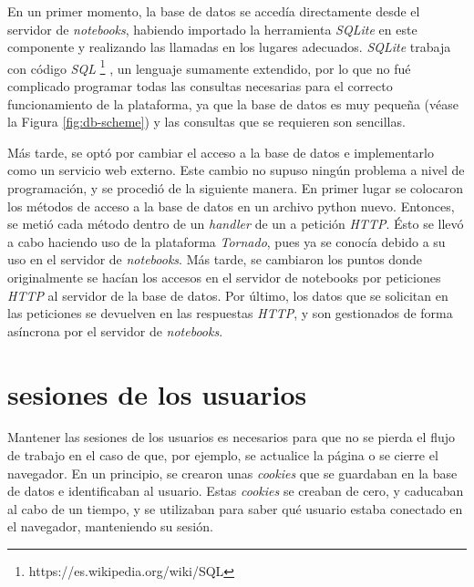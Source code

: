\documentclass[11pt,spanish,listoffigures,listoftables]{tfgetsinf}
\begin{document}
En un primer momento, la base de datos se accedía directamente desde el servidor de \textit{notebooks}, habiendo importado la herramienta \textit{SQLite} en este componente y realizando las llamadas en los lugares adecuados. \textit{SQLite} trabaja con código \textit{SQL} \footnote{https://es.wikipedia.org/wiki/SQL} , un lenguaje sumamente extendido,  por lo que no fué complicado programar todas las consultas necesarias para el correcto funcionamiento de la plataforma, ya que la base de datos es muy pequeña (véase la Figura \ref{fig:db-scheme}) y las consultas que se requieren son sencillas.

Más tarde, se optó por cambiar el acceso a la base de datos e implementarlo como un servicio web externo. Este cambio no supuso ningún problema a nivel de programación, y se procedió de la siguiente manera. En primer lugar se colocaron los métodos de acceso a la base de datos en un archivo python nuevo. Entonces, se metió cada método dentro de un \textit{handler} de un a petición \textit{HTTP}. Ésto se llevó a cabo haciendo uso de la plataforma \textit{Tornado}, pues ya se conocía debido a su uso en el servidor de \textit{notebooks}. Más tarde, se cambiaron los puntos donde originalmente se hacían los accesos en el servidor de notebooks por peticiones \textit{HTTP} al servidor de la base de datos. Por último, los datos que se solicitan en las peticiones se devuelven en las respuestas \textit{HTTP}, y son gestionados de forma asíncrona por el servidor de \textit{notebooks}.



\section{sesiones de los usuarios}
\label{sec:desarrollo-sesiones}

Mantener las sesiones de los usuarios es necesarios para que no se pierda el flujo de trabajo en el caso de que, por ejemplo, se actualice la página o se cierre el navegador. En un principio, se crearon unas \textit{cookies} que se guardaban en la base de datos e identificaban al usuario. Estas \textit{cookies} se creaban de cero, y caducaban al cabo de un tiempo, y se utilizaban para saber qué usuario estaba conectado en el navegador, manteniendo su sesión. 
\end{document}
